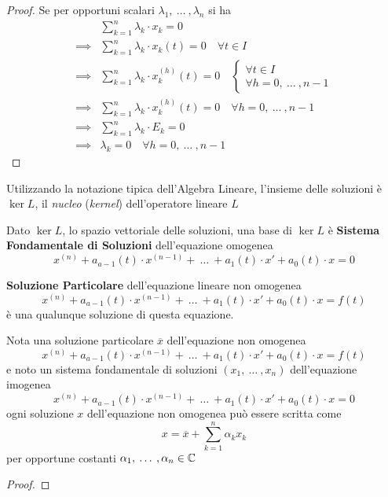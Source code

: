 \begin{proposition}
\begin{proof}
		Se per opportuni scalari $\lambda_1,\:\dotsc\:,\lambda_n$ si ha
		\begin{align*}
			& \sum\limits_{k=1}^{n} \lambda_k \cdot x_k = 0\\
			\implies & \sum\limits_{k=1}^{n} \lambda_k \cdot x_k(t) = 0 \quad \forall t \in I\\
			\implies & \sum\limits_{k=1}^{n} \lambda_k \cdot x_k^{(h)}(t) = 0 \quad \begin{cases}\forall t \in I\\\forall h = 0,\:\dotsc\:, n-1	\end{cases}\\
			\implies & \sum\limits_{k=1}^{n} \lambda_k \cdot x_k^{(h)}(t) = 0 \quad \forall h = 0,\:\dotsc\:, n-1\\
			\implies & \sum\limits_{k=1}^{n} \lambda_k \cdot E_k = 0\\
			\implies & \lambda_k = 0\quad \forall h = 0,\:\dotsc\:, n-1
		\end{align*}
	\end{proof}
\end{proposition}

\begin{note}
	Utilizzando la notazione tipica dell'Algebra Lineare, l'insieme delle soluzioni è $\ker L$, il \textit{nucleo} (\textit{kernel}) dell'operatore lineare $L$
\end{note}

\begin{definition}
	Dato $\ker L$, lo spazio vettoriale delle soluzioni, una base di $\ker L$ è \textbf{Sistema Fondamentale di Soluzioni} dell'equazione omogenea
	\[x^{(n)} + a_{a-1}(t) \cdot x^{(n-1)} +\:\ldots\:+ a_1(t) \cdot x' + a_0(t) \cdot x = 0\]
\end{definition}
\begin{definition}
	\textbf{Soluzione Particolare} dell'equazione lineare non omogenea
	\[x^{(n)} + a_{a-1}(t) \cdot x^{(n-1)} +\:\ldots\:+ a_1(t) \cdot x' + a_0(t) \cdot x = f(t)\]
	è una qualunque soluzione di questa equazione.
\end{definition}

\begin{proposition}
	Nota una soluzione particolare $\overline{x}$ dell'equazione non omogenea
	\[x^{(n)} + a_{a-1}(t) \cdot x^{(n-1)} +\:\ldots\:+ a_1(t) \cdot x' + a_0(t) \cdot x = f(t)\]
	e noto un sistema fondamentale di soluzioni $(x_1,\:\dotsc\:,x_n)$ dell'equazione imogenea
	\[x^{(n)} + a_{a-1}(t) \cdot x^{(n-1)} +\:\ldots\:+ a_1(t) \cdot x' + a_0(t) \cdot x = 0\]
	ogni soluzione $x$ dell'equazione non omogenea può essere scritta come
	\[x = \overline{x} + \sum\limits_{k=1}^n \alpha_k x_k\]
	per opportune costanti $\alpha_1,\:\dotsc\:,\alpha_n \in \mathbb{C}$
	\begin{proof}
	\end{proof}
\end{proposition}

